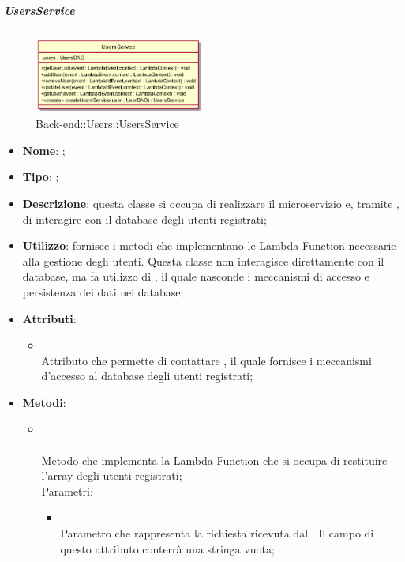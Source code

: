 \hypertarget{UsersService_label}{\subparagraph{UsersService}}
\begin{figure}[h]
	\centering
	\includegraphics[width=0.50\textwidth,height=\textheight,keepaspectratio]{images/ClassUsersService.png}
	\caption{Back-end::Users::UsersService}
\end{figure}
\begin{itemize}
	\item \textbf{Nome}: ;
	\item \textbf{Tipo}: ;
	\item \textbf{Descrizione}: questa classe si occupa di realizzare il microservizio  e, tramite , di interagire con il database degli utenti registrati;
	\item \textbf{Utilizzo}: fornisce i metodi che implementano le Lambda Function necessarie alla gestione degli utenti.
	Questa classe non interagisce direttamente con il database, ma fa utilizzo di , il quale nasconde i meccanismi di accesso e persistenza dei dati nel database;
	\item \textbf{Attributi}:
	\begin{itemize}
		\item[]  \\
		Attributo che permette di contattare , il quale fornisce i meccanismi d'accesso al database degli utenti registrati;
	\end{itemize}
	\item \textbf{Metodi}:
	\begin{itemize}
		\item[]  \\\\		Metodo che implementa la Lambda Function che si occupa di restituire l'array degli utenti registrati;\\
		Parametri:
		\begin{itemize}
			\item {} \\
			Parametro che rappresenta la richiesta ricevuta dal . Il campo  di questo attributo conterrà una stringa vuota;

\end{itemize}
\end{itemize}
\end{itemize}
